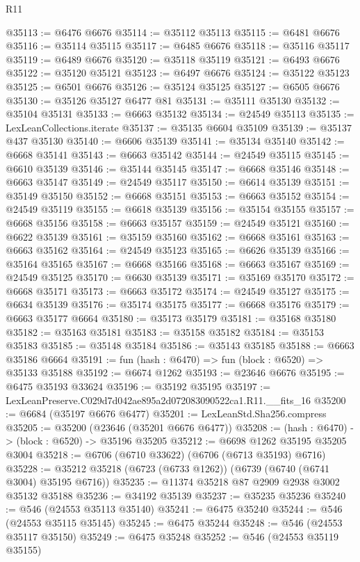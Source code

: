 \begin{lexlean}{R11}
\begin{coremodule}
@35113 := @6476 @6676
@35114 := @35112 @35113
@35115 := @6481 @6676
@35116 := @35114 @35115
@35117 := @6485 @6676
@35118 := @35116 @35117
@35119 := @6489 @6676
@35120 := @35118 @35119
@35121 := @6493 @6676
@35122 := @35120 @35121
@35123 := @6497 @6676
@35124 := @35122 @35123
@35125 := @6501 @6676
@35126 := @35124 @35125
@35127 := @6505 @6676
@35130 := @35126 @35127 @6477 @81
@35131 := @35111 @35130
@35132 := @35104 @35131
@35133 := @6663 @35132
@35134 := @24549 @35113
@35135 := LexLeanCollections.iterate
@35137 := @35135 @6604 @35109
@35139 := @35137 @437 @35130
@35140 := @6606 @35139
@35141 := @35134 @35140
@35142 := @6668 @35141
@35143 := @6663 @35142
@35144 := @24549 @35115
@35145 := @6610 @35139
@35146 := @35144 @35145
@35147 := @6668 @35146
@35148 := @6663 @35147
@35149 := @24549 @35117
@35150 := @6614 @35139
@35151 := @35149 @35150
@35152 := @6668 @35151
@35153 := @6663 @35152
@35154 := @24549 @35119
@35155 := @6618 @35139
@35156 := @35154 @35155
@35157 := @6668 @35156
@35158 := @6663 @35157
@35159 := @24549 @35121
@35160 := @6622 @35139
@35161 := @35159 @35160
@35162 := @6668 @35161
@35163 := @6663 @35162
@35164 := @24549 @35123
@35165 := @6626 @35139
@35166 := @35164 @35165
@35167 := @6668 @35166
@35168 := @6663 @35167
@35169 := @24549 @35125
@35170 := @6630 @35139
@35171 := @35169 @35170
@35172 := @6668 @35171
@35173 := @6663 @35172
@35174 := @24549 @35127
@35175 := @6634 @35139
@35176 := @35174 @35175
@35177 := @6668 @35176
@35179 := @6663 @35177 @6664
@35180 := @35173 @35179
@35181 := @35168 @35180
@35182 := @35163 @35181
@35183 := @35158 @35182
@35184 := @35153 @35183
@35185 := @35148 @35184
@35186 := @35143 @35185
@35188 := @6663 @35186 @6664
@35191 := fun (hash : @6470) => fun (block : @6520) => @35133 @35188
@35192 := @6674 @1262
@35193 := @23646 @6676
@35195 := @6475 @35193 @33624
@35196 := @35192 @35195
@35197 := LexLeanPreserve.C029d7d042ae895a2d072083090522ca1.R11.__fits_16
@35200 := @6684 (@35197 @6676 @6477)
@35201 := LexLeanStd.Sha256.compress
@35205 := @35200 (@23646 (@35201 @6676 @6477))
@35208 := (hash : @6470) -> (block : @6520) -> @35196 @35205
@35212 := @6698 @1262 @35195 @35205 @3004
@35218 := @6706 (@6710 @33622) (@6706 (@6713 @35193) @6716)
@35228 := @35212 @35218 (@6723 (@6733 @1262)) (@6739 (@6740 (@6741 @3004) @35195 @6716))
@35235 := @11374 @35218 @87 @2909 @2938 @3002 @35132 @35188
@35236 := @34192 @35139
@35237 := @35235 @35236
@35240 := @546 (@24553 @35113 @35140)
@35241 := @6475 @35240
@35244 := @546 (@24553 @35115 @35145)
@35245 := @6475 @35244
@35248 := @546 (@24553 @35117 @35150)
@35249 := @6475 @35248
@35252 := @546 (@24553 @35119 @35155)

\end{coremodule}
\end{lexlean}

